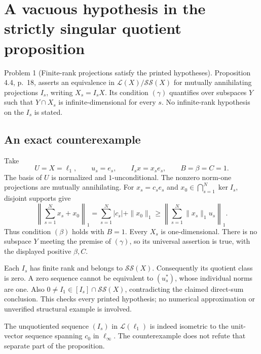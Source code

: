 \documentclass[10pt]{article}
\begin{document}
\section*{A vacuous hypothesis in the strictly singular quotient proposition}
Problem 1 (Finite-rank projections satisfy the printed hypotheses).  Proposition 4.4, p. 18, asserts an equivalence in \(\mathcal L(X)/\mathcal{SS}(X)\) for mutually annihilating projections \(I_s\), writing \(X_s=I_sX\). Its condition \((\gamma)\) quantifies over subspaces \(Y\) such that \(Y\cap X_s\) is infinite-dimensional for every \(s\). No infinite-rank hypothesis on the \(I_s\) is stated.\par
\subsection*{An exact counterexample}
Take \[U=X=\ell_1,\qquad u_s=e_s,\qquad I_sx=x_se_s,
 \qquad B=\beta=C=1.\] The basis of \(U\) is normalized and \(1\)-unconditional. The nonzero norm-one projections are mutually annihilating. For \(x_s=c_se_s\) and \(x_0\in\bigcap_{s=1}^N\ker I_s\), disjoint supports give \[\left\|\sum_{s=1}^Nx_s+x_0\right\|_1
 =\sum_{s=1}^N|c_s|+\|x_0\|_1
 \geq
 \left\|\sum_{s=1}^N\|x_s\|_1u_s\right\|_1.\] Thus condition \((\beta)\) holds with \(B=1\). Every \(X_s\) is one-dimensional. There is no subspace \(Y\) meeting the premise of \((\gamma)\), so its universal assertion is true, with the displayed positive \(\beta,C\).\par
Each \(I_s\) has finite rank and belongs to \(\mathcal{SS}(X)\). Consequently its quotient class is zero. A zero sequence cannot be equivalent to \((u_s^*)\), whose individual norms are one. Also \(0\neq I_1\in[I_s]\cap\mathcal{SS}(X)\), contradicting the claimed direct-sum conclusion. This checks every printed hypothesis; no numerical approximation or unverified structural example is involved.\par
The unquotiented sequence \((I_s)\) in \(\mathcal L(\ell_1)\) is indeed isometric to the unit-vector sequence spanning \(c_0\) in \(\ell_\infty\). The counterexample does not refute that separate part of the proposition.\par
\end{document}

